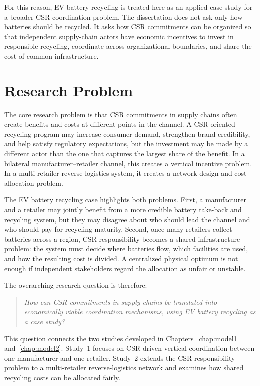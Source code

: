 For this reason, EV battery recycling is treated here as an applied case study for a broader CSR coordination problem. The dissertation does not ask only how batteries should be recycled. It asks how CSR commitments can be organized so that independent supply-chain actors have economic incentives to invest in responsible recycling, coordinate across organizational boundaries, and share the cost of common infrastructure.

\section{Research Problem}
\label{sec:intro_problem}

The core research problem is that CSR commitments in supply chains often create benefits and costs at different points in the channel. A CSR-oriented recycling program may increase consumer demand, strengthen brand credibility, and help satisfy regulatory expectations, but the investment may be made by a different actor than the one that captures the largest share of the benefit. In a bilateral manufacturer--retailer channel, this creates a vertical incentive problem. In a multi-retailer reverse-logistics system, it creates a network-design and cost-allocation problem.

The EV battery recycling case highlights both problems. First, a manufacturer and a retailer may jointly benefit from a more credible battery take-back and recycling system, but they may disagree about who should lead the channel and who should pay for recycling maturity. Second, once many retailers collect batteries across a region, CSR responsibility becomes a shared infrastructure problem: the system must decide where batteries flow, which facilities are used, and how the resulting cost is divided. A centralized physical optimum is not enough if independent stakeholders regard the allocation as unfair or unstable.

The overarching research question is therefore:

\begin{quote}
\emph{How can CSR commitments in supply chains be translated into economically viable coordination mechanisms, using EV battery recycling as a case study?}
\end{quote}

This question connects the two studies developed in Chapters~\ref{chap:model1} and~\ref{chap:model2}. Study~1 focuses on CSR-driven vertical coordination between one manufacturer and one retailer. Study~2 extends the CSR responsibility problem to a multi-retailer reverse-logistics network and examines how shared recycling costs can be allocated fairly.

